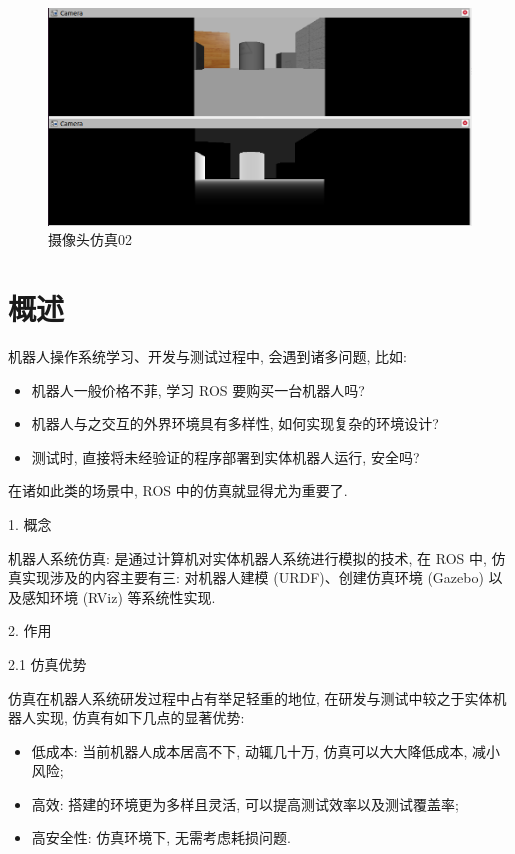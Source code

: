 \documentclass[openany, fontset=windowsold]{ctexbook}
\theoremstyle{kaiti}
\theoremstyle{normal}
\begin{document}
\begin{figure}[!ht]
  \centering
  \includegraphics[width=.9\textwidth]{ros_sim_camera_02.png}
  \caption{摄像头仿真02}
  \label{fig:ros_sim_camera_02}
\end{figure}

\section{概述}

机器人操作系统学习、开发与测试过程中, 会遇到诸多问题, 比如:

\begin{itemize}
  \item 机器人一般价格不菲, 学习 ROS 要购买一台机器人吗? 
  \item 机器人与之交互的外界环境具有多样性, 如何实现复杂的环境设计?
  \item 测试时, 直接将未经验证的程序部署到实体机器人运行, 安全吗?
\end{itemize}

在诸如此类的场景中, ROS 中的仿真就显得尤为重要了.

1. 概念

机器人系统仿真: 是通过计算机对实体机器人系统进行模拟的技术, 在 ROS 中, 仿真实现涉及的内容主要有三: 对机器人建模 (URDF)、创建仿真环境 (Gazebo) 以及感知环境 (RViz) 等系统性实现.

2. 作用

2.1 仿真优势

仿真在机器人系统研发过程中占有举足轻重的地位, 在研发与测试中较之于实体机器人实现, 仿真有如下几点的显著优势:

\begin{itemize}
  \item 低成本: 当前机器人成本居高不下, 动辄几十万, 仿真可以大大降低成本, 减小风险;
  \item 高效: 搭建的环境更为多样且灵活, 可以提高测试效率以及测试覆盖率;
  \item 高安全性: 仿真环境下, 无需考虑耗损问题.
\end{itemize}
\end{document}
